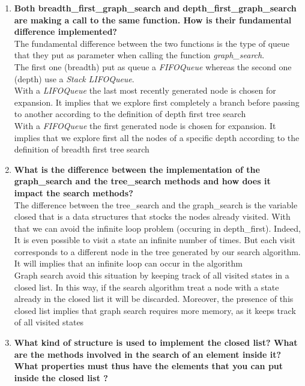 \documentclass[10pt,a4paper]{article}
\begin{document}
\begin{enumerate}
	
	\item \textbf{Both breadth\_first\_graph\_search and depth\_first\_graph\_search are making a call to the same function. How is their fundamental difference implemented?} \\
	
	The fundamental difference between the two functions is the type of queue that they put as parameter when calling the function \textit{graph\_search}.\\
	The first one (breadth) put as queue a \textit{FIFOQueue} whereas the second one (depth) use a \textit{Stack} \textit{LIFOQueue}.\\
	With a \textit{LIFOQueue} the last most recently generated node is chosen for expansion. It implies that we explore first completely a branch before passing to another according to the definition of depth first tree search \\
	With a \textit {FIFOQueue} the first generated node is chosen for expansion. It implies that  we explore first all the nodes of a specific depth according to the definition of breadth first tree search
	
	
	\item \textbf{What is the difference between the implementation of the graph\_search and the tree\_search methods and how does it impact the search methods?}\\
	
	The difference between the tree\_search and the graph\_search is the variable closed that is a data structures that stocks the nodes already visited. With that we can avoid the infinite loop problem (occuring in depth\_first).
	Indeed, It is even possible to visit a state an infinite number of times. But each visit corresponds to a different node in the tree generated by our search algorithm. It will implies that an infinite loop can occur in the algorithm \\
	Graph search avoid this situation by keeping track of all visited states in a closed list. In this way, if the search algorithm treat a node with a state already in the closed list it will be discarded.
	Moreover, the presence of this closed list implies that graph search requires more memory, as it keeps track of all visited states \\
	
	
	\item \textbf{What kind of structure is used to implement the closed list? What are the methods involved in the search of an element inside it? What properties must thus have the elements that you can put inside the closed list ?} \\
	

\end{enumerate}
\end{document}
